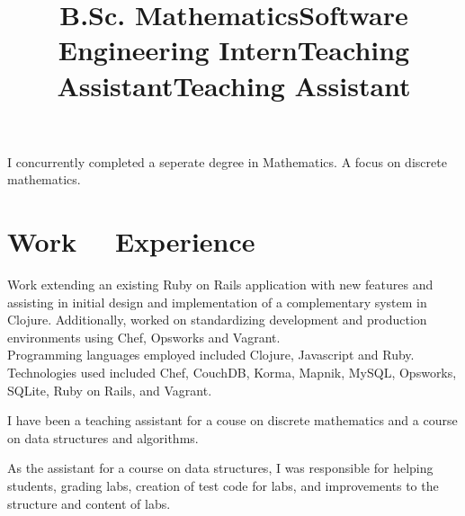 \documentclass[margintitle,line]{res}
\renewcommand{\subsection}[1]{\section{\normalfont #1}}
\begin{document}
\begin{resume}
\title{B.Sc. Mathematics}
\begin{position}
   I concurrently completed a seperate degree in Mathematics. A focus on discrete mathematics.
\end{position}



\section{Work \ \ Experience}

\title{Software Engineering Intern}
\begin{position}
 Work extending an existing Ruby on Rails application with new features and assisting in initial design and implementation of a complementary system in  Clojure. Additionally, worked on standardizing development and production environments using Chef, Opsworks and Vagrant. \\
 Programming languages employed included Clojure, Javascript and Ruby. \\
 Technologies used included Chef, CouchDB, Korma, Mapnik, MySQL, Opsworks, SQLite, Ruby on Rails, and Vagrant.
\end{position}

\title{Teaching Assistant}
\begin{position}
 I have been a teaching assistant for a couse on discrete mathematics and a course on data structures and algorithms.
\end{position}

\title{Teaching Assistant}
\begin{position}
 As the assistant for a course on data structures, I was responsible for helping students, grading labs, creation of test code for labs, and improvements to the structure and content of labs.
\end{position}


\end{resume}
\end{document}
